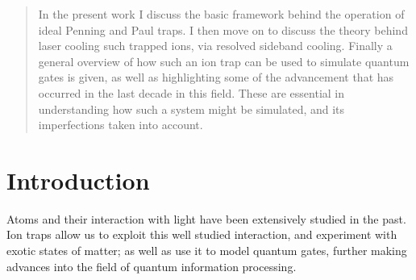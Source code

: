 \documentclass[12pt,twoside]{article}
\date{Oct 2021}
\begin{document}




\clearpage{\pagestyle{empty}\cleardoublepage}
\setcounter{page}{1}
\pagestyle{fancy}

\vspace*{\fill}
\begin{abstract}
In the present work I discuss the basic framework behind the operation of ideal Penning and Paul traps.  I then move on to discuss the theory behind laser cooling such trapped ions, via resolved sideband cooling. Finally a general overview of how such an ion trap can be used to simulate quantum gates is given, as well as highlighting some of the advancement that has occurred in the last decade in this field. These are essential in understanding how such a system might be simulated, and its imperfections taken into account.
\end{abstract}
\vspace*{\fill}
\newpage



\tableofcontents

\clearpage{\pagestyle{empty}\cleardoublepage}
\setcounter{page}{1}
\fancyhead[LE,RO]{\slshape \rightmark}
\fancyhead[LO,RE]{\slshape \leftmark}

\section{Introduction}
\label{Intro}

Atoms and their interaction with light have been extensively studied in the past\cite{Foot,Woodgate}. Ion traps allow us to exploit this well studied interaction, and experiment with exotic states of matter\cite{Thompson_Coulomb_Crystals,Dipole_trap_BEC}; as well as use it to model quantum gates, further making advances into the field of quantum information processing\cite{Cold_trapped_ions_QC}.
\end{document}
